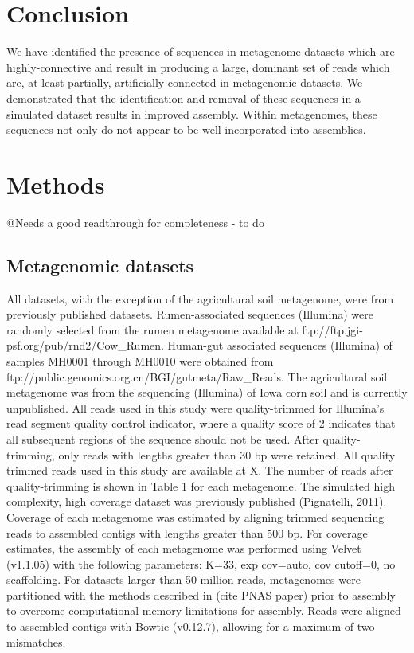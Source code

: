\documentclass[11pt]{article} %
\begin{document}
\section{Conclusion}
	We have identified the presence of sequences in metagenome datasets which are highly-connective and result in producing a large, dominant set of reads which are, at least partially, artificially  connected in metagenomic datasets.  We demonstrated that the identification and removal of these sequences in a simulated dataset results in improved assembly.  Within metagenomes, these sequences not only do not appear to be well-incorporated into assemblies.  




\section{Methods}

@Needs a good readthrough for completeness - to do

\subsection{Metagenomic datasets}

All datasets, with the exception of the agricultural soil metagenome, were from
previously published datasets. Rumen-associated sequences (Illumina)
were randomly selected from the rumen metagenome available at ftp://ftp.jgi-psf.org/pub/rnd2/Cow\_Rumen. Human-gut associated sequences (Illumina) of samples MH0001 through MH0010 were obtained from ftp://public.genomics.org.cn/BGI/gutmeta/Raw\_Reads. The agricultural
soil metagenome was from the sequencing (Illumina) of Iowa corn soil and is currently unpublished. All reads used in this study were quality-trimmed for Illumina's read segment quality control indicator, where a quality score of 2 indicates that all subsequent
regions of the sequence should not be used. After quality-trimming,
only reads with lengths greater than 30 bp were retained. All quality
trimmed reads used in this study are available at X.  The number of reads after quality-trimming is shown in Table 1 for each metagenome. The simulated high complexity, high coverage
dataset was previously published (Pignatelli, 2011).  Coverage of each metagenome was estimated by aligning trimmed sequencing reads to assembled contigs with lengths greater than 500 bp.  For coverage estimates, the assembly of each metagenome was performed using Velvet (v1.1.05) with the following parameters:  K=33, exp cov=auto, cov cutoff=0, no scaffolding.  For datasets larger than 50 million reads, metagenomes were partitioned with the methods described in (cite PNAS paper) prior to assembly to overcome computational memory limitations for assembly.  Reads were aligned to assembled contigs with Bowtie (v0.12.7), allowing for a maximum of two mismatches.  
\end{document}
